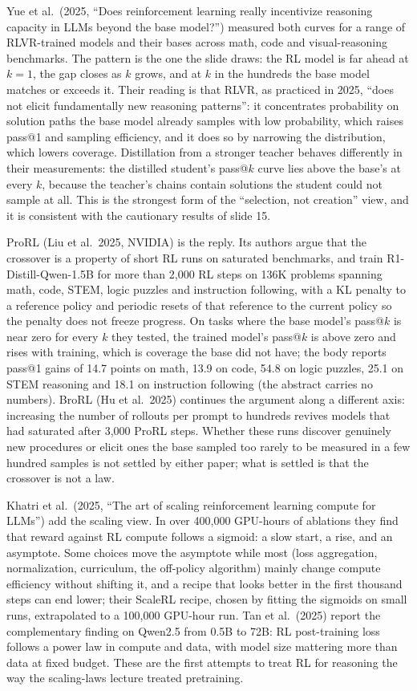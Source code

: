 \documentclass[11pt,letterpaper]{article}
\begin{document}
Yue et al.\ (2025, ``Does reinforcement learning really incentivize reasoning capacity in LLMs beyond the base model?'') measured both curves for a range of RLVR-trained models and their bases across math, code and visual-reasoning benchmarks. The pattern is the one the slide draws: the RL model is far ahead at $k=1$, the gap closes as $k$ grows, and at $k$ in the hundreds the base model matches or exceeds it. Their reading is that RLVR, as practiced in 2025, ``does not elicit fundamentally new reasoning patterns'': it concentrates probability on solution paths the base model already samples with low probability, which raises pass@1 and sampling efficiency, and it does so by narrowing the distribution, which lowers coverage. Distillation from a stronger teacher behaves differently in their measurements: the distilled student's pass@$k$ curve lies above the base's at every $k$, because the teacher's chains contain solutions the student could not sample at all. This is the strongest form of the ``selection, not creation'' view, and it is consistent with the cautionary results of slide 15.

ProRL (Liu et al.\ 2025, NVIDIA) is the reply. Its authors argue that the crossover is a property of short RL runs on saturated benchmarks, and train R1-Distill-Qwen-1.5B for more than 2,000 RL steps on 136K problems spanning math, code, STEM, logic puzzles and instruction following, with a KL penalty to a reference policy and periodic resets of that reference to the current policy so the penalty does not freeze progress. On tasks where the base model's pass@$k$ is near zero for every $k$ they tested, the trained model's pass@$k$ is above zero and rises with training, which is coverage the base did not have; the body reports pass@1 gains of 14.7 points on math, 13.9 on code, 54.8 on logic puzzles, 25.1 on STEM reasoning and 18.1 on instruction following (the abstract carries no numbers). BroRL (Hu et al.\ 2025) continues the argument along a different axis: increasing the number of rollouts per prompt to hundreds revives models that had saturated after 3,000 ProRL steps. Whether these runs discover genuinely new procedures or elicit ones the base sampled too rarely to be measured in a few hundred samples is not settled by either paper; what is settled is that the crossover is not a law.

Khatri et al.\ (2025, ``The art of scaling reinforcement learning compute for LLMs'') add the scaling view. In over 400,000 GPU-hours of ablations they find that reward against RL compute follows a sigmoid: a slow start, a rise, and an asymptote. Some choices move the asymptote while most (loss aggregation, normalization, curriculum, the off-policy algorithm) mainly change compute efficiency without shifting it, and a recipe that looks better in the first thousand steps can end lower; their ScaleRL recipe, chosen by fitting the sigmoids on small runs, extrapolated to a 100,000 GPU-hour run. Tan et al.\ (2025) report the complementary finding on Qwen2.5 from 0.5B to 72B: RL post-training loss follows a power law in compute and data, with model size mattering more than data at fixed budget. These are the first attempts to treat RL for reasoning the way the scaling-laws lecture treated pretraining.
\end{document}
